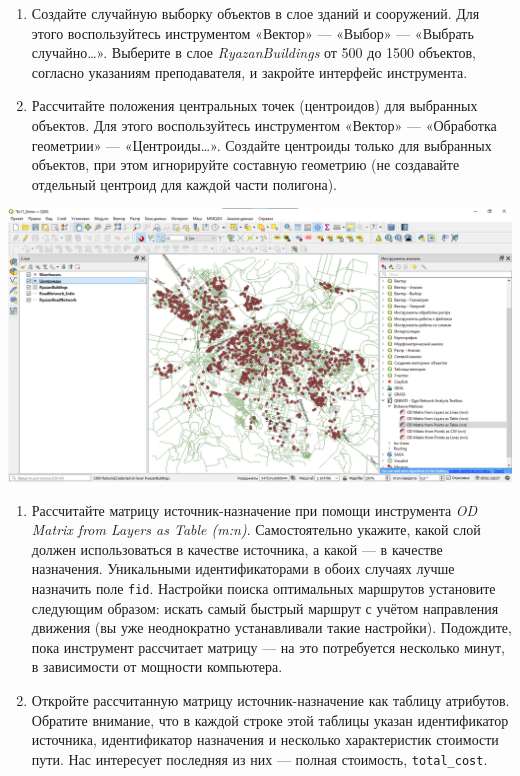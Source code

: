 \documentclass[
  12pt,
]{book}
\begin{document}
\begin{enumerate}
\def\labelenumi{\arabic{enumi}.}
\item
  Создайте случайную выборку объектов в слое зданий и сооружений. Для этого воспользуйтесь инструментом «Вектор» --- «Выбор» --- «Выбрать случайно\ldots». Выберите в слое \emph{RyazanBuildings} от 500 до 1500 объектов, согласно указаниям преподавателя, и закройте интерфейс инструмента.
\item
  Рассчитайте положения центральных точек (центроидов) для выбранных объектов. Для этого воспользуйтесь инструментом «Вектор» --- «Обработка геометрии» --- «Центроиды\ldots». Создайте центроиды только для выбранных объектов, при этом игнорируйте составную геометрию (не создавайте отдельный центроид для каждой части полигона).
\end{enumerate}

\includegraphics{images/Ex11_RoadNetwork/centroids.png}

\begin{enumerate}
\def\labelenumi{\arabic{enumi}.}
\setcounter{enumi}{2}
\item
  Рассчитайте матрицу источник-назначение при помощи инструмента \emph{OD Matrix from Layers as Table (m:n)}. Самостоятельно укажите, какой слой должен использоваться в качестве источника, а какой --- в качестве назначения. Уникальными идентификаторами в обоих случаях лучше назначить поле \texttt{fid}. Настройки поиска оптимальных маршрутов установите следующим образом: искать самый быстрый маршрут с учётом направления движения (вы уже неоднократно устанавливали такие настройки). Подождите, пока инструмент рассчитает матрицу --- на это потребуется несколько минут, в зависимости от мощности компьютера.
\item
  Откройте рассчитанную матрицу источник-назначение как таблицу атрибутов. Обратите внимание, что в каждой строке этой таблицы указан идентификатор источника, идентификатор назначения и несколько характеристик стоимости пути. Нас интересует последняя из них --- полная стоимость, \texttt{total\_cost}.
\end{enumerate}
\end{document}
